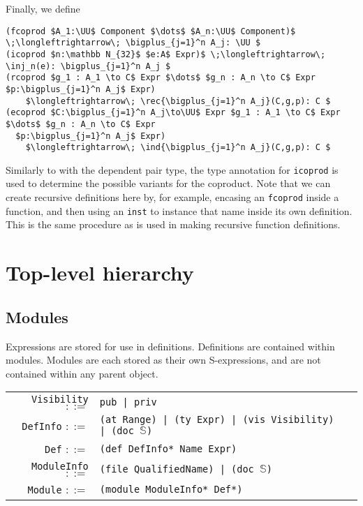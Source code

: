 \documentclass[11pt]{book}
\DeclareMathOperator*{\bigplus}{\scalerel*{+}{\textstyle\sum}}
\begin{document}
Finally, we define
\begin{lstlisting}[mathescape=true]
(fcoprod $A_1:\UU$ Component $\dots$ $A_n:\UU$ Component)$ \;\longleftrightarrow\; \bigplus_{j=1}^n A_j: \UU $
(icoprod $n:\mathbb N_{32}$ $e:A$ Expr)$ \;\longleftrightarrow\; \inj_n(e): \bigplus_{j=1}^n A_j $
(rcoprod $g_1 : A_1 \to C$ Expr $\dots$ $g_n : A_n \to C$ Expr $p:\bigplus_{j=1}^n A_j$ Expr)
    $\longleftrightarrow\; \rec{\bigplus_{j=1}^n A_j}(C,g,p): C $
(ecoprod $C:\bigplus_{j=1}^n A_j\to\UU$ Expr $g_1 : A_1 \to C$ Expr $\dots$ $g_n : A_n \to C$ Expr
  $p:\bigplus_{j=1}^n A_j$ Expr)
    $\longleftrightarrow\; \ind{\bigplus_{j=1}^n A_j}(C,g,p): C $
\end{lstlisting}
Similarly to with the dependent pair type, the type annotation for \lstinline{icoprod} is used to determine the possible variants for the coproduct.
Note that we can create recursive definitions here by, for example, encasing an \lstinline{fcoprod} inside a function, and then using an \lstinline{inst} to instance that name inside its own definition.
This is the same procedure as is used in making recursive function definitions.


\section{Top-level hierarchy}

\subsection{Modules}

Expressions are stored for use in definitions.
Definitions are contained within modules.
Modules are each stored as their own S-expressions, and are not contained within any parent object.

\begin{tabular}{r l p{7cm}}
    \lstinline!Visibility! \( ::= \) & \lstinline!pub | priv! \\
    \lstinline!DefInfo! \( ::= \) & \lstinline!(at Range) | (ty Expr) | (vis Visibility) | (doc !\( \mathbb S \)\lstinline!)! \\
    \lstinline!Def! \( ::= \) & \lstinline!(def DefInfo* Name Expr)! \\
    \lstinline!ModuleInfo! \( ::= \) & \lstinline!(file QualifiedName) | (doc !\( \mathbb S \)\lstinline!)! \\
    \lstinline!Module! \( ::= \) & \lstinline!(module ModuleInfo* Def*)!
\end{tabular}
\end{document}
